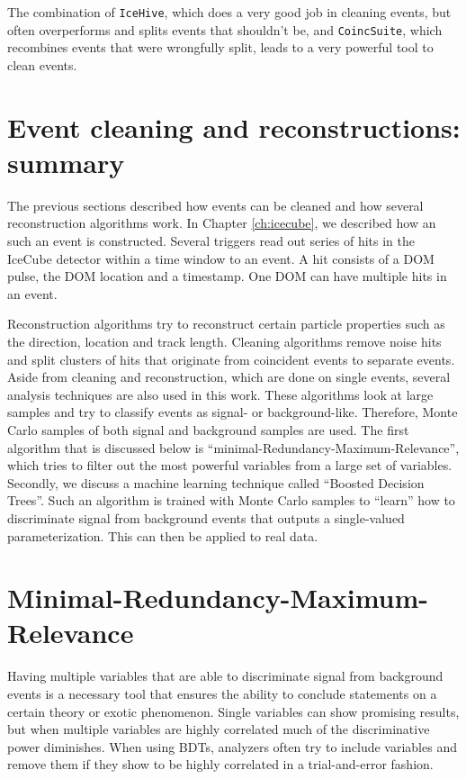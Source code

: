 \vspace{2mm}
\noindent The combination of \texttt{IceHive}, which does a very good job in cleaning events, but often overperforms and splits events that shouldn't be, and \texttt{CoincSuite}, which recombines events that were wrongfully split, leads to a very powerful tool to clean events.


\section{Event cleaning and reconstructions: summary}
The previous sections described how events can be cleaned and how several reconstruction algorithms work. In Chapter \ref{ch:icecube}, we described how an such an event is constructed. Several triggers read out series of hits in the IceCube detector within a time window to an event. A hit consists of a DOM pulse, the DOM location and a timestamp. One DOM can have multiple hits in an event.

Reconstruction algorithms try to reconstruct certain particle properties such as the direction, location and track length. Cleaning algorithms remove noise hits and split clusters of hits that originate from coincident events to separate events.\\

\noindent Aside from cleaning and reconstruction, which are done on single events, several analysis techniques are also used in this work. These algorithms look at large samples and try to classify events as signal- or background-like. Therefore, Monte Carlo samples of both signal and background samples are used. The first algorithm that is discussed below is ``minimal-Redundancy-Maximum-Relevance'', which tries to filter out the most powerful variables from a large set of variables. Secondly, we discuss a machine learning technique called ``Boosted Decision Trees''. Such an algorithm is trained with Monte Carlo samples to ``learn'' how to discriminate signal from background events that outputs a single-valued parameterization. This can then be applied to real data.



\section{Minimal-Redundancy-Maximum-Relevance}
\label{sec:mrmr}
Having multiple variables that are able to discriminate signal from background events is a necessary tool that ensures the ability to conclude statements on a certain theory or exotic phenomenon. Single variables can show promising results, but when multiple variables are highly correlated much of the discriminative power diminishes. When using BDTs, analyzers often try to include variables and remove them if they show to be highly correlated in a trial-and-error fashion.


